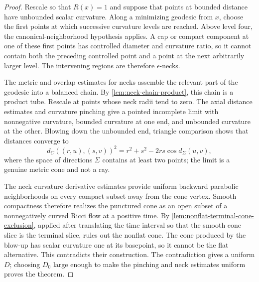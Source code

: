 \begin{proof}
Rescale so that $R(x)=1$ and suppose that points at bounded distance have
unbounded scalar curvature.  Along a minimizing geodesic from $x$, choose
the first points at which successive curvature levels are reached.  Above
level four, the canonical-neighborhood hypothesis applies.  A cap or compact
component at one of these first points has controlled diameter and curvature
ratio, so it cannot contain both the preceding controlled point and a point
at the next arbitrarily larger level.  The intervening regions are therefore
$\epsilon$-necks.

The metric and overlap estimates for necks assemble the relevant part of the
geodesic into a balanced chain.  By \ref{lem:neck-chain-product}, this chain
is a product tube.  Rescale at points whose neck radii tend to zero.  The
axial distance estimates and curvature pinching give a pointed incomplete
limit with nonnegative curvature, bounded curvature at one end, and
unbounded curvature at the other.  Blowing down the unbounded end, triangle
comparison shows that distances converge to
\[
 d_C((r,u),(s,v))^2=r^2+s^2-2rs\cos d_\Sigma(u,v),
\]
where the space of directions $\Sigma$ contains at least two points; the
limit is a genuine metric cone and not a ray.

The neck curvature derivative estimates provide uniform backward parabolic
neighborhoods on every compact subset away from the cone vertex.  Smooth
compactness therefore realizes the punctured cone as an open subset of a
nonnegatively curved Ricci flow at a positive time.  By
  \ref{lem:nonflat-terminal-cone-exclusion}, applied after translating the
 time interval so that the smooth cone slice is the terminal slice, rules out
 the nonflat cone.  The cone produced by the blow-up has scalar curvature one
 at its basepoint, so it cannot be the flat alternative.  This contradicts
 their construction.  The contradiction gives a uniform $D$;
choosing $D_0$ large enough to make the pinching and neck estimates uniform
proves the theorem.
\end{proof}

